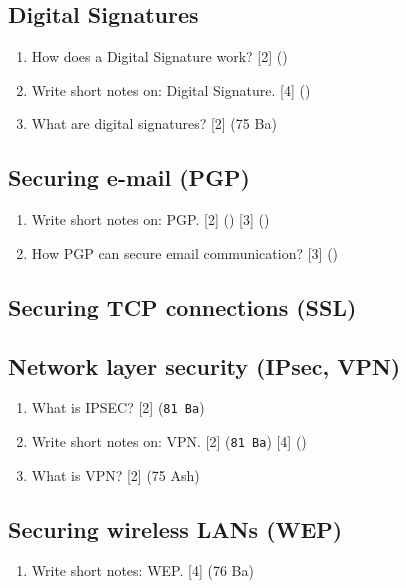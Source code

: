 \documentclass[12pt]{article}
\begin{document}
	\subsection{Digital Signatures}
		\begin{enumerate}[noitemsep, topsep=0pt]
			\item How does a Digital Signature work? \hfill [2] ()
			
			\item Write short notes on: Digital Signature. \hfill [4] ()

			\item What are digital signatures? \hfill [2] (75 Ba)
		\end{enumerate}

	\subsection{Securing e-mail (PGP)}
		\begin{enumerate}[noitemsep, topsep=0pt]
			\item Write short notes on: PGP. \hfill [2] () [3] ()

			\item How PGP can secure email communication? \hfill [3] ()
		\end{enumerate}

	\subsection{Securing TCP connections (SSL)}
	\subsection{Network layer security (IPsec, VPN)}
		\begin{enumerate}[noitemsep, topsep=0pt]
			\item What is IPSEC? \hfill [2] (\texttt{81 Ba})

			\item Write short notes on: VPN. \hfill [2] (\texttt{81 Ba}) [4] ()

			\item What is VPN? \hfill [2] (75 Ash)
		\end{enumerate}

	\subsection{Securing wireless LANs (WEP)}
		\begin{enumerate}[noitemsep, topsep=0pt]
			\item Write short notes: WEP. \hfill [4] (76 Ba)
		\end{enumerate}
\end{document}
